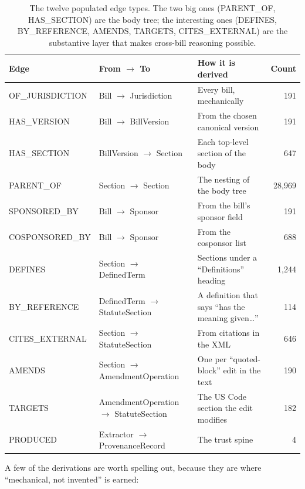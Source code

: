 \documentclass[11pt]{article}
\newcommand{\code}[1]{{\ttfamily\small #1}}
\begin{document}
\begin{table}[ht]
\centering\footnotesize
\begin{tabular}{@{}llp{6.9cm}r@{}}
\toprule
\textbf{Edge} & \textbf{From $\rightarrow$ To} & \textbf{How it is derived} & \textbf{Count}\\
\midrule
\code{OF\_JURISDICTION} & Bill $\rightarrow$ Jurisdiction & Every bill, mechanically & 191\\
\code{HAS\_VERSION}     & Bill $\rightarrow$ BillVersion  & From the chosen canonical version & 191\\
\code{HAS\_SECTION}     & BillVersion $\rightarrow$ Section & Each top-level section of the body & 647\\
\code{PARENT\_OF}       & Section $\rightarrow$ Section    & The nesting of the body tree & 28{,}969\\
\code{SPONSORED\_BY}    & Bill $\rightarrow$ Sponsor      & From the bill's sponsor field & 191\\
\code{COSPONSORED\_BY}  & Bill $\rightarrow$ Sponsor      & From the cosponsor list & 688\\
\code{DEFINES}          & Section $\rightarrow$ DefinedTerm & Sections under a ``Definitions'' heading & 1{,}244\\
\code{BY\_REFERENCE}    & DefinedTerm $\rightarrow$ StatuteSection & A definition that says ``has the meaning given\ldots'' & 114\\
\code{CITES\_EXTERNAL}  & Section $\rightarrow$ StatuteSection & From \code{<external-xref>} citations in the XML & 646\\
\code{AMENDS}           & Section $\rightarrow$ AmendmentOperation & One per ``quoted-block'' edit in the text & 190\\
\code{TARGETS}          & AmendmentOperation $\rightarrow$ StatuteSection & The US Code section the edit modifies & 182\\
\code{PRODUCED}         & Extractor $\rightarrow$ ProvenanceRecord & The trust spine & 4\\
\bottomrule
\end{tabular}
\caption{The twelve populated edge types. The two big ones (\code{PARENT\_OF},
\code{HAS\_SECTION}) are the body tree; the interesting ones (\code{DEFINES},
\code{BY\_REFERENCE}, \code{AMENDS}, \code{TARGETS}, \code{CITES\_EXTERNAL}) are
the substantive layer that makes cross-bill reasoning possible.}
\end{table}

A few of the derivations are worth spelling out, because they are where
``mechanical, not invented'' is earned:
\end{document}
